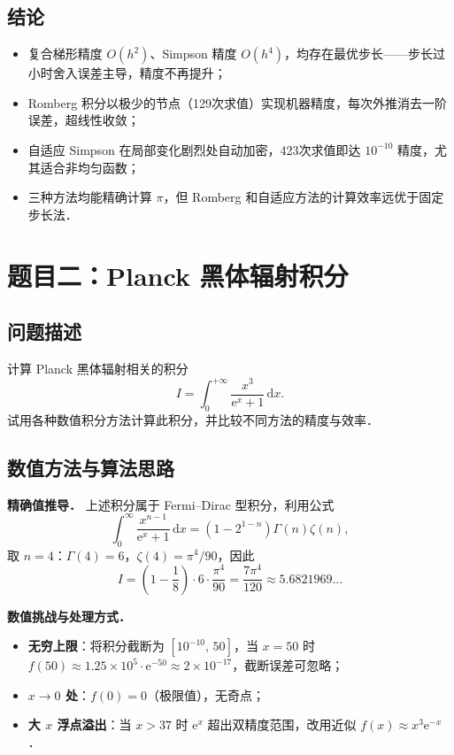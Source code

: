 \documentclass[UTF8,a4paper,11pt]{article}
\begin{document}
\subsection{结论}

\begin{itemize}
  \item 复合梯形精度 $O(h^2)$、Simpson 精度 $O(h^4)$，均存在最优步长——步长过小时舍入误差主导，精度不再提升；
  \item Romberg 积分以极少的节点（129次求值）实现机器精度，每次外推消去一阶误差，超线性收敛；
  \item 自适应 Simpson 在局部变化剧烈处自动加密，423次求值即达 $10^{-10}$ 精度，尤其适合非均匀函数；
  \item 三种方法均能精确计算 $\pi$，但 Romberg 和自适应方法的计算效率远优于固定步长法．
\end{itemize}

\clearpage

\section{题目二：Planck 黑体辐射积分}

\subsection{问题描述}

计算 Planck 黑体辐射相关的积分
$$I = \int_0^{+\infty}\frac{x^3}{\mathrm{e}^x+1}\,\mathrm{d}x.$$
试用各种数值积分方法计算此积分，并比较不同方法的精度与效率．

\subsection{数值方法与算法思路}

\noindent\textbf{精确值推导．}
上述积分属于 Fermi–Dirac 型积分，利用公式
$$\int_0^{\infty}\frac{x^{n-1}}{\mathrm{e}^x+1}\,\mathrm{d}x = \left(1-2^{1-n}\right)\Gamma(n)\zeta(n),$$
取 $n=4$：$\Gamma(4)=6$，$\zeta(4)=\pi^4/90$，因此
$$I = \left(1-\frac{1}{8}\right)\cdot 6\cdot\frac{\pi^4}{90} = \frac{7\pi^4}{120} \approx 5.6821969\ldots$$

\noindent\textbf{数值挑战与处理方式．}
\begin{itemize}
  \item \textbf{无穷上限}：将积分截断为 $[10^{-10},\, 50]$，当 $x=50$ 时 $f(50)\approx 1.25\times10^5\cdot\mathrm{e}^{-50}\approx 2\times10^{-17}$，截断误差可忽略；
  \item \textbf{$x\to0$ 处}：$f(0)=0$（极限值），无奇点；
  \item \textbf{大 $x$ 浮点溢出}：当 $x>37$ 时 $\mathrm{e}^x$ 超出双精度范围，改用近似 $f(x)\approx x^3\mathrm{e}^{-x}$．
\end{itemize}
\end{document}
